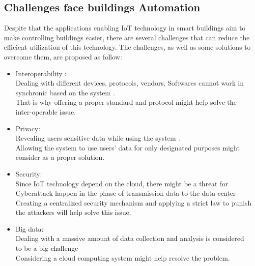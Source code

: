 \documentclass[conference]{IEEEtran}
\begin{document}
\subsection{Challenges face buildings Automation }

Despite that the applications enabling  IoT technology in smart buildings aim to make controlling buildings easier, there are several challenges that can reduce the efficient utilization of this technology. The challenges, as well as some solutions to overcome them, are proposed as follow: \cite{mic}\\

\begin{itemize}
	
	\item Interoperability :\\
Dealing with different devices, protocols, vendors, Softwares cannot work in synchronic based on the system .\\
That is why offering a proper standard and protocol might help solve the inter-operable issue. \\


\item Privacy:\\
Revealing users sensitive data while using the system .\\
Allowing the system to use users' data for only designated purposes might consider as a proper solution. \\

\item Security: \\
Since IoT technology depend on the cloud, there might be a threat for Cyberattack happen in the phase of transmission data to the data center\\

Creating a centralized security mechanism and applying a strict law to punish the attackers will help solve this issue.\\

\item Big data:\\
Dealing with a massive amount of data collection and analysis is considered to be a big challenge  \\
Considering a cloud computing system might help resolve the problem. 
	 

	
\end{itemize}
\end{document}
